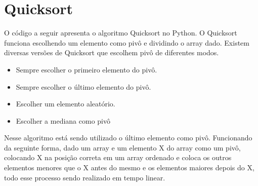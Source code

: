     \section{Quicksort}
    O código a seguir apresenta o algoritmo Quicksort no Python. O Quicksort funciona escolhendo um elemento como pivô e dividindo o array dado. Existem diversas versões de Quicksort que escolhem pivô de diferentes modos.
    \begin{itemize}
    	\item Sempre escolher o primeiro elemento do pivô.
    	\item Sempre escolher o último elemento do pivô.
    	\item Escolher um elemento aleatório.
    	\item Escolher a mediana como pivô
    \end{itemize}
	Nesse algoritmo está sendo utilizado o último elemento como pivô. Funcionando da seguinte forma, dado um array e um elemento X do array como um pivô, colocando X na posição correta em um array ordenado e coloca os outros elementos menores que o X antes do mesmo e os elementos maiores depois do X, todo esse processo sendo realizado em tempo linear.
